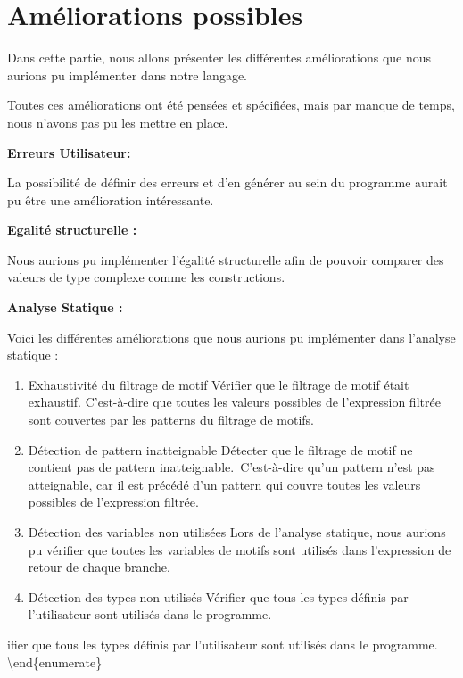 \documentclass[
  12pt,
]{article}
\begin{document}
\section{Améliorations possibles}\label{amuxe9liorations-possibles}

Dans cette partie, nous allons présenter les différentes améliorations
que nous aurions pu implémenter dans notre langage.

Toutes ces améliorations ont été pensées et spécifiées, mais par manque
de temps, nous n'avons pas pu les mettre en place.

\textbf{Erreurs Utilisateur:}

La possibilité de définir des erreurs et d'en générer au sein du
programme aurait pu être une amélioration intéressante.

\textbf{Egalité structurelle :}

Nous aurions pu implémenter l'égalité structurelle afin de pouvoir
comparer des valeurs de type complexe comme les constructions.

\textbf{Analyse Statique :}

Voici les différentes améliorations que nous aurions pu implémenter dans
l'analyse statique :

\begin{enumerate}
      \item
            Exhaustivité du filtrage de motif
            Vérifier que le filtrage de motif était exhaustif. C'est-à-dire que toutes les valeurs possibles de l’expression filtrée sont couvertes par les patterns du filtrage de motifs.
      \item
            Détection de pattern inatteignable
            Détecter que le filtrage de motif ne contient pas de pattern inatteignable.\
            C'est-à-dire qu'un pattern n'est pas atteignable, car il est précédé d'un pattern qui couvre toutes les valeurs possibles de l'expression filtrée.
      \item
            Détection des variables non utilisées
            Lors de l'analyse statique, nous aurions pu vérifier que toutes les variables de motifs sont utilisés dans l'expression de retour de chaque branche.
      \item
            Détection des types non utilisés
            Vérifier que tous les types définis par l'utilisateur sont utilisés dans le programme.
\end{enumerate}

ifier que tous les types définis par l'utilisateur sont utilisés dans le
programme. \textbackslash end\{enumerate\}
\end{document}
